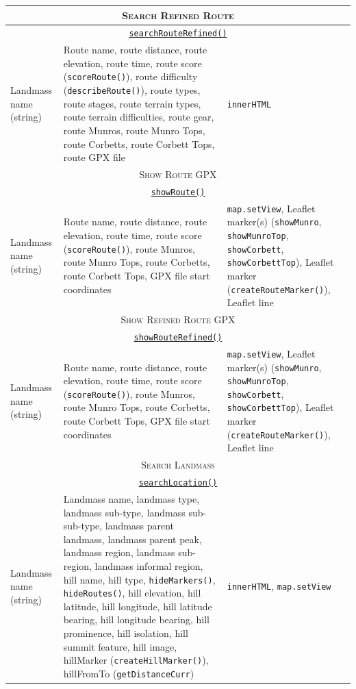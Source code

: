 \documentclass[11pt, english]{article}
\begin{document}
\begin{center}
\begin{longtable}{p{4cm}p{6cm}p{2cm}}
		\hline
		\multicolumn{3}{c}{\textsc{Search Refined Route}}\\
		\hline
		\multicolumn{3}{c}{\underline{\texttt{searchRouteRefined()}}}\\
		Landmass name (string) & Route name, route distance, route elevation, route time, route score (\texttt{scoreRoute()}), route difficulty (\texttt{describeRoute()}), route types, route stages, route terrain types, route terrain difficulties, route gear, route Munros, route Munro Tops, route Corbetts, route Corbett Tops, route GPX file & \texttt{innerHTML}\\
		\hline
		\multicolumn{3}{c}{\textsc{Show Route GPX}}\\
		\hline
		\multicolumn{3}{c}{\underline{\texttt{showRoute()}}}\\
		Landmass name (string) & Route name, route distance, route elevation, route time, route score (\texttt{scoreRoute()}), route Munros, route Munro Tops, route Corbetts, route Corbett Tops, GPX file start coordinates & \texttt{map.setView}, Leaflet marker(s) (\texttt{showMunro}, \texttt{showMunroTop}, \texttt{showCorbett}, \texttt{showCorbettTop}), Leaflet marker (\texttt{createRouteMarker()}), Leaflet line\\
		\hline
		\multicolumn{3}{c}{\textsc{Show Refined Route GPX}}\\
		\hline
		\multicolumn{3}{c}{\underline{\texttt{showRouteRefined()}}}\\
		Landmass name (string) & Route name, route distance, route elevation, route time, route score (\texttt{scoreRoute()}), route Munros, route Munro Tops, route Corbetts, route Corbett Tops, GPX file start coordinates & \texttt{map.setView}, Leaflet marker(s) (\texttt{showMunro}, \texttt{showMunroTop}, \texttt{showCorbett}, \texttt{showCorbettTop}), Leaflet marker (\texttt{createRouteMarker()}), Leaflet line\\
		\hline
		\multicolumn{3}{c}{\textsc{Search Landmass}}\\
		\hline
		\multicolumn{3}{c}{\underline{\texttt{searchLocation()}}}\\
		Landmass name (string) & Landmass name, landmass type, landmass sub-type, landmass sub-sub-type, landmass parent landmass, landmass parent peak, landmass region, landmass sub-region, landmass informal region, hill name, hill type, \texttt{hideMarkers()}, \texttt{hideRoutes()}, hill elevation, hill latitude, hill longitude, hill latitude bearing, hill longitude bearing, hill prominence, hill isolation, hill summit feature, hill image, hillMarker (\texttt{createHillMarker()}), hillFromTo (\texttt{getDistanceCurr}) & \texttt{innerHTML}, \texttt{map.setView}\\

\end{longtable}
\end{center}
\end{document}
